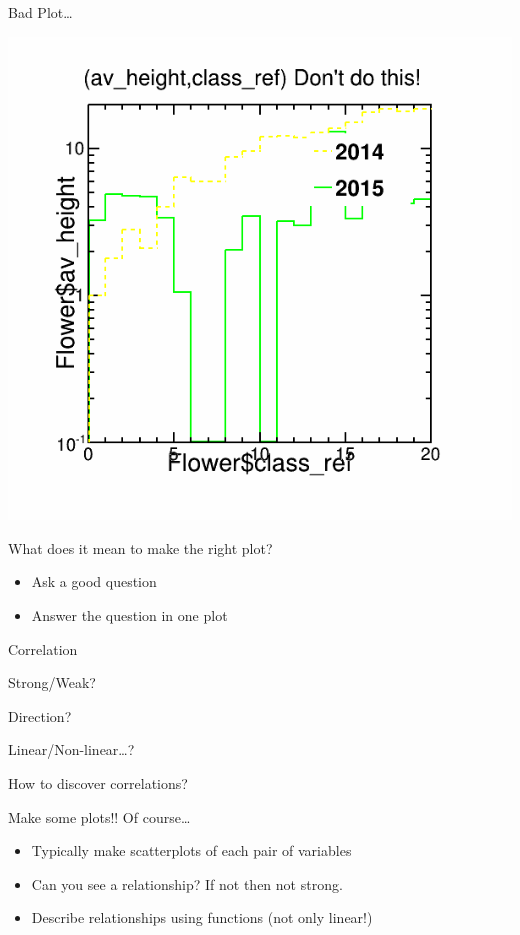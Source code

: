 \documentclass{beamer}
\begin{document}
\begin{frame}{Bad Plot\ldots}
\begin{center}
\includegraphics[scale=0.35]{pics/badplot.png}
\end{center}
\end{frame}

\begin{frame}{What does it mean to make the right plot?}

\begin{itemize}
\item Ask a good question
\item Answer the question in one plot
\end{itemize}

\end{frame}


\begin{frame}{Correlation}

Strong/Weak?

\vspace{5mm}

Direction?

\vspace{5mm}

Linear/Non-linear\ldots?

\end{frame}


\begin{frame}{How to discover correlations?}

Make some plots!!  Of course\ldots

\begin{itemize}
\item Typically make scatterplots of each pair of variables
\item Can you see a relationship?  If not then not strong.
\item Describe relationships using functions (not only linear!)
\end{itemize}

\end{frame}
\end{document}

